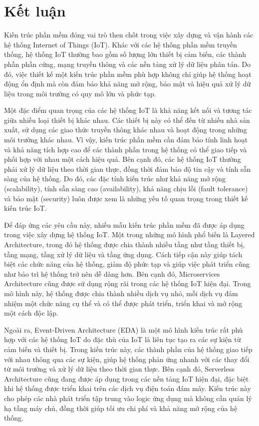 \section{Kết luận}
Kiến trúc phần mềm đóng vai trò then chốt trong việc xây dựng và vận hành các hệ thống Internet of Things (IoT). Khác với các hệ thống phần mềm truyền thống, hệ thống IoT thường bao gồm số lượng lớn thiết bị cảm biến, các thành phần phần cứng, mạng truyền thông và các nền tảng xử lý dữ liệu phân tán. Do đó, việc thiết kế một kiến trúc phần mềm phù hợp không chỉ giúp hệ thống hoạt động ổn định mà còn đảm bảo khả năng mở rộng, bảo mật và hiệu quả xử lý dữ liệu trong môi trường có quy mô lớn và phức tạp.

Một đặc điểm quan trọng của các hệ thống IoT là khả năng kết nối và tương tác giữa nhiều loại thiết bị khác nhau. Các thiết bị này có thể đến từ nhiều nhà sản xuất, sử dụng các giao thức truyền thông khác nhau và hoạt động trong những môi trường khác nhau. Vì vậy, kiến trúc phần mềm cần đảm bảo tính linh hoạt và khả năng tích hợp cao để các thành phần trong hệ thống có thể giao tiếp và phối hợp với nhau một cách hiệu quả. Bên cạnh đó, các hệ thống IoT thường phải xử lý dữ liệu theo thời gian thực, đồng thời đảm bảo độ tin cậy và tính sẵn sàng của hệ thống. Do đó, các đặc tính kiến trúc như khả năng mở rộng (scalability), tính sẵn sàng cao (availability), khả năng chịu lỗi (fault tolerance) và bảo mật (security) luôn được xem là những yếu tố quan trọng trong thiết kế kiến trúc IoT.

Để đáp ứng các yêu cầu này, nhiều mẫu kiến trúc phần mềm đã được áp dụng trong việc xây dựng hệ thống IoT. Một trong những mô hình phổ biến là Layered Architecture, trong đó hệ thống được chia thành nhiều tầng như tầng thiết bị, tầng mạng, tầng xử lý dữ liệu và tầng ứng dụng. Cách tiếp cận này giúp tách biệt các chức năng của hệ thống, giảm độ phức tạp và giúp việc phát triển cũng như bảo trì hệ thống trở nên dễ dàng hơn. Bên cạnh đó, Microservices Architecture cũng được sử dụng rộng rãi trong các hệ thống IoT hiện đại. Trong mô hình này, hệ thống được chia thành nhiều dịch vụ nhỏ, mỗi dịch vụ đảm nhiệm một chức năng cụ thể và có thể được phát triển, triển khai và mở rộng một cách độc lập.

Ngoài ra, Event-Driven Architecture (EDA) là một mô hình kiến trúc rất phù hợp với các hệ thống IoT do đặc thù của IoT là liên tục tạo ra các sự kiện từ cảm biến và thiết bị. Trong kiến trúc này, các thành phần của hệ thống giao tiếp với nhau thông qua các sự kiện, giúp hệ thống phản ứng nhanh với các thay đổi từ môi trường và xử lý dữ liệu theo thời gian thực. Bên cạnh đó, Serverless Architecture cũng đang được áp dụng trong các nền tảng IoT hiện đại, đặc biệt khi hệ thống được triển khai trên các dịch vụ điện toán đám mây. Kiến trúc này cho phép các nhà phát triển tập trung vào logic ứng dụng mà không cần quản lý hạ tầng máy chủ, đồng thời giúp tối ưu chi phí và khả năng mở rộng của hệ thống.


